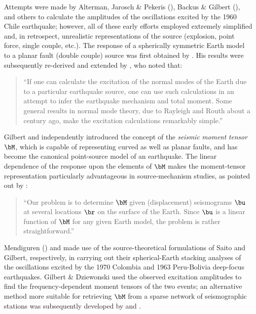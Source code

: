 Attempts were made by Alterman, Jarosch \& Pekeris
(\citeyear{alterman&al59}), Backus \& Gilbert
(\citeyear{backus&gilbert61}), and others to
calculate the amplitudes of the oscillations
excited by the 1960 Chile earthquake;
however, all of these early efforts employed
extremely simplified and, in retrospect,
unrealistic representations of the source
(explosion, point force, single couple, etc.).
The response of a spherically symmetric Earth model
to a planar fault (double couple) source was first
obtained by \textcite{saito67}.  His results were
subsequently re-derived and extended by
\textcite{gilbert70}, who noted that:
\begin{quote}
``If one can calculate the excitation of the normal
modes of the Earth due to a particular earthquake
source, one can use such calculations in an attempt
to infer the earthquake mechanism and total moment.
Some general results in normal mode theory, due to
Rayleigh and Routh about a century ago, make the
excitation calculations remarkably simple.''
\end{quote}
Gilbert and \textcite{kostrov70} independently
introduced the concept of the {\em seismic moment tensor\/}
%
$\bM$, which is capable of representing curved
as well as planar faults, and has become the
canonical point-source model of an earthquake.
The linear dependence of the response upon the
elements of $\bM$ makes the moment-tensor
representation particularly advantageous
in source-mechanism studies, as pointed
out by \textcite{gilbert73}:
\begin{quote}
``Our problem is to determine $\bM$ given
(displacement) seismograms $\bu$ at several
locations $\br$ on the surface of the Earth.
Since $\bu$ is a linear function of $\bM$
for any given Earth model, the problem is
rather straightforward.''
\end{quote}
Mendiguren (\citeyear{mendiguren73})
and \textcite{gilbert&dziewonski75} made use of the
source-theoretical formulations of Saito and Gilbert,
respectively, in carrying out their spherical-Earth
stacking analyses of the oscillations excited by the 1970
Colombia and 1963 Peru-Bolivia deep-focus earthquakes.
Gilbert \& Dziewonski used the observed excitation amplitudes
to find the frequency-dependent moment tensors of the two events;
an alternative method more suitable for retrieving $\bM$
from a sparse network of seismographic stations was
subsequently developed by \textcite{buland&gilbert76}
and \textcite{gilbert&buland76}.

